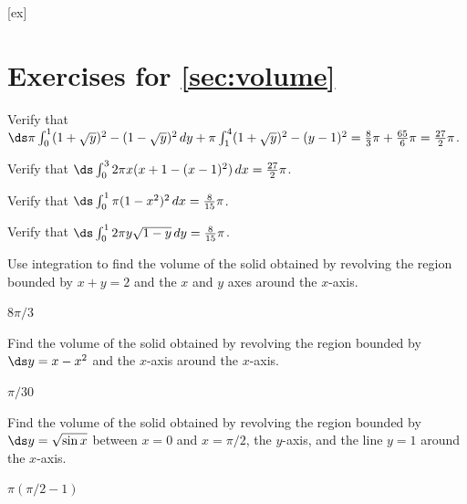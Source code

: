 [ex]
\section*{Exercises for \ref{sec:volume}}

\begin{enumialphparenastyle}

\begin{ex}
Verify that $\ds\pi\int_0^1 (1+\sqrt{y})^2-(1-\sqrt{y})^2\,dy+
\pi\int_1^4  (1+\sqrt{y})^2-(y-1)^2={8\over3}\pi + {65\over6}\pi
={27\over2}\pi$.
\end{ex}

\begin{ex}
 Verify that $\ds\int_0^3 2\pi x(x+1-(x-1)^2)\,dx={27\over2}\pi$.
\end{ex}

\begin{ex}
 Verify that $\ds \int_0^1 \pi(1-x^2)^2\,dx={8\over15}\pi$.
\end{ex}

\begin{ex}
 Verify that $\ds \int_0^1 2\pi y \sqrt{1-y}\,dy={8\over15}\pi$.
\end{ex}

\begin{ex}
Use integration to find the volume of the solid obtained by revolving 
the region bounded by $x+y=2$ and the $x$ and $y$ axes around the
$x$-axis. 
\begin{sol}
 $8\pi/3$
\end{sol}
\end{ex}

\begin{ex}
Find the volume of the solid obtained by revolving 
the region bounded by $\ds y=x-x^2$
and the $x$-axis around the
$x$-axis. 
\begin{sol}
 $\pi/30$
\end{sol}
\end{ex}

\begin{ex}
Find the volume of the solid obtained by revolving 
the region bounded by $\ds y=\sqrt{\sin x}$ between $x=0$ and
$x=\pi/2$, the $y$-axis, and the line
$y=1$ around the
$x$-axis. 
\begin{sol}
 $\pi(\pi/2-1)$
\end{sol}
\end{ex}


\end{enumialphparenastyle}
